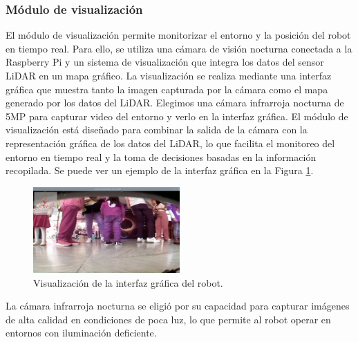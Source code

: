     \subsubsection{M\'odulo de visualizaci\'on} %
    \label{ssub:modvis}
    El m\'odulo de visualizaci\'on permite monitorizar el entorno y la posici\'on del robot en
        tiempo real. Para ello, se utiliza una c\'amara de visi\'on nocturna conectada a la
        Raspberry Pi y un sistema de visualizaci\'on que integra los datos del sensor LiDAR en
        un mapa gr\'afico. La visualizaci\'on se realiza mediante una interfaz gr\'afica que muestra
        tanto la imagen capturada por la c\'amara como el mapa generado por los datos del
        LiDAR.
    \vskip 0.5cm
    Elegimos una c\'amara infrarroja nocturna de 5MP para capturar video del entorno y
        verlo en la interfaz gr\'afica.
    \vskip 0.5cm
    El m\'odulo de visualizaci\'on est\'a dise\~nado para combinar la salida de la c\'amara con la
        representaci\'on gr\'afica de los datos del LiDAR, lo que facilita el monitoreo del entorno
        en tiempo real y la toma de decisiones basadas en la informaci\'on recopilada. Se puede ver un 
        ejemplo de la interfaz gr\'afica en la Figura \ref{fig:robot02}.
    \vskip 0.5cm
    \begin{figure}[htbp]
        \centering
        \includegraphics[width=0.5\textwidth]{./images/Pruebas/robot/robot02.jpeg}
        \caption{Visualizaci\'on de la interfaz gr\'afica del robot.}
        \label{fig:robot02}
    \end{figure}
    La c\'amara infrarroja nocturna se eligi\'o por su capacidad para capturar im\'agenes de alta
        calidad en condiciones de poca luz, lo que permite al robot operar en entornos con
        iluminaci\'on deficiente.
    \vskip 0.5cm
